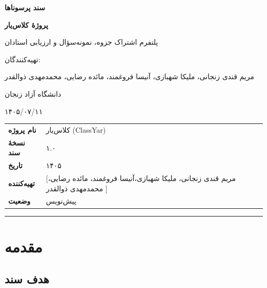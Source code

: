 \documentclass[12pt, a4paper]{article}
\begin{document}
\begin{titlepage}
\centering
\vspace*{3cm}
{\Huge\bfseries سند پرسوناها\par}
\vspace{0.5cm}
{\LARGE\bfseries پروژهٔ کلاس‌یار\par}
\vspace{0.5cm}
{\large پلتفرم اشتراک جزوه، نمونه‌سؤال و ارزیابی استادان\par}
\vspace{2cm}
{\large تهیه‌کنندگان:\par}
{\large مریم قندی زنجانی، ملیکا شهبازی، آنیسا فروغمند، مائده رضایی، محمدمهدی ذوالقدر\par}
\vspace{0.5cm}
{\large دانشگاه آزاد زنجان\par}
\vspace{1cm}
{\large ۱۴۰۵/۰۷/۱۱\par}
\end{titlepage}

\tableofcontents
\newpage

{\def\LTcaptype{none} %
\begin{longtable}[]{@{}
  >{\raggedright\arraybackslash}p{}
  >{\raggedright\arraybackslash}p{}@{}}
\toprule\noalign{}
\endhead
\bottomrule\noalign{}
\endlastfoot
\textbf{نام پروژه} & کلاس‌یار (ClassYar) \\
\textbf{نسخهٔ سند} & ۱.۰ \\
\textbf{تاریخ} & ۱۴۰۵ \\
\textbf{تهیه‌کننده} & {[}مریم قندی زنجانی، ملیکا شهبازی،آنیسا فروغمند، مائده رضایی، محمدمهدی ذوالقدر {]} \\
\textbf{وضعیت} & پیش‌نویس \\
\end{longtable}
}

\begin{center}\rule{0.5\linewidth}{0.5pt}\end{center}

\section{مقدمه}

\subsection{هدف سند}
\end{document}
